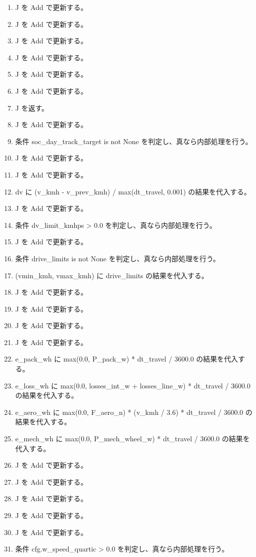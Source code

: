\documentclass[a4paper,11pt]{article}
\begin{document}
\begin{enumerate}[leftmargin=1.8em]
\item   J を Add で更新する。
\item   J を Add で更新する。
\item   J を Add で更新する。
\item   J を Add で更新する。
\item   J を Add で更新する。
\item   J を Add で更新する。
\item   J を返す。
\item J を Add で更新する。
\item 条件 soc\_day\_track\_target is not None を判定し、真なら内部処理を行う。
\item   J を Add で更新する。
\item   J を Add で更新する。
\item dv に (v\_kmh - v\_prev\_kmh) / max(dt\_travel, 0.001) の結果を代入する。
\item J を Add で更新する。
\item 条件 dv\_limit\_kmhps > 0.0 を判定し、真なら内部処理を行う。
\item   J を Add で更新する。
\item 条件 drive\_limits is not None を判定し、真なら内部処理を行う。
\item   (vmin\_kmh, vmax\_kmh) に drive\_limits の結果を代入する。
\item   J を Add で更新する。
\item   J を Add で更新する。
\item J を Add で更新する。
\item J を Add で更新する。
\item e\_pack\_wh に max(0.0, P\_pack\_w) * dt\_travel / 3600.0 の結果を代入する。
\item e\_loss\_wh に max(0.0, losses\_int\_w + losses\_line\_w) * dt\_travel / 3600.0 の結果を代入する。
\item e\_aero\_wh に max(0.0, F\_aero\_n) * (v\_kmh / 3.6) * dt\_travel / 3600.0 の結果を代入する。
\item e\_mech\_wh に max(0.0, P\_mech\_wheel\_w) * dt\_travel / 3600.0 の結果を代入する。
\item J を Add で更新する。
\item J を Add で更新する。
\item J を Add で更新する。
\item J を Add で更新する。
\item J を Add で更新する。
\item 条件 cfg.w\_speed\_quartic > 0.0 を判定し、真なら内部処理を行う。

\end{enumerate}
\end{document}
